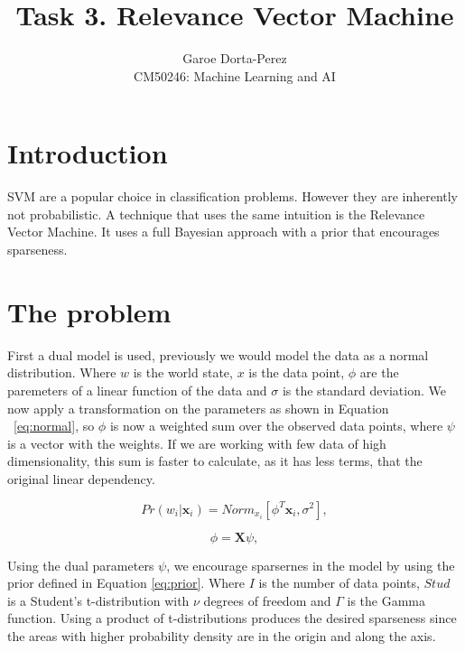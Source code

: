\documentclass[12pt]{article}
\begin{document}
  
\title{Task 3. Relevance Vector Machine}
\author{Garoe Dorta-Perez\\
CM50246: Machine Learning and AI}
 
\maketitle
 
\section{Introduction}
 
SVM  are a popular choice in classification problems.
However they are inherently not probabilistic.
A technique that uses the same intuition is the Relevance Vector Machine.
It uses a full Bayesian approach with a prior that encourages sparseness.

\section{The problem}

First a dual model is used, previously we would model the data as a normal distribution.
Where $w$ is the world state, $x$ is the data point, $\phi$ are the paremeters of a linear function of the data and $\sigma$ is the standard deviation.
We now apply a transformation on the parameters as shown in Equation ~\ref{eq:normal}, so $\phi$ is now a weighted sum over the observed data points, where $\psi$ is a vector with the weights.
If we are working with few data of high dimensionality, this sum is faster to calculate, as it has less terms, that the original linear dependency.

\begin{equation}
\label{eq:normal}
Pr(w_i|\mathbf{x}_i) = Norm_{x_i}[\phi^T \mathbf{x}_i, \sigma^2],
\end{equation}

\begin{equation}
\label{eq:dual}
\phi = \mathbf{X} \psi,
\end{equation}

Using the dual parameters $\psi$, we encourage sparsernes in the model by using the prior defined in Equation \ref{eq:prior}.
Where $I$ is the number of data points, $Stud$ is a Student's t-distribution with $\nu$ degrees of freedom and $\Gamma$ is the Gamma function.
Using a product of t-distributions produces the desired sparseness since the areas with higher probability density are in the origin and along the axis.
\end{document}
